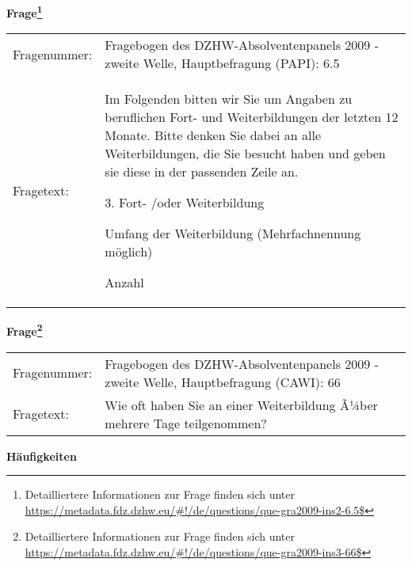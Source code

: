 				\vspace*{0.5cm}
                \noindent\textbf{Frage\footnote{Detailliertere Informationen zur Frage finden sich unter
		              \url{https://metadata.fdz.dzhw.eu/\#!/de/questions/que-gra2009-ins2-6.5$}}}\\
				\begin{tabularx}{\hsize}{@{}lX}
					Fragenummer: &
					  Fragebogen des DZHW-Absolventenpanels 2009 - zweite Welle, Hauptbefragung (PAPI):
					  6.5
 \\
					Fragetext: & Im Folgenden bitten wir Sie um Angaben zu beruflichen Fort- und Weiterbildungen der letzten 12 Monate. Bitte denken Sie dabei an alle Weiterbildungen, die Sie besucht haben und geben sie diese in der passenden Zeile an.\par  3. Fort- /oder Weiterbildung\par  Umfang der Weiterbildung (Mehrfachnennung möglich)\par  Anzahl \\
				\end{tabularx}
				\vspace*{0.5cm}
                \noindent\textbf{Frage\footnote{Detailliertere Informationen zur Frage finden sich unter
		              \url{https://metadata.fdz.dzhw.eu/\#!/de/questions/que-gra2009-ins3-66$}}}\\
				\begin{tabularx}{\hsize}{@{}lX}
					Fragenummer: &
					  Fragebogen des DZHW-Absolventenpanels 2009 - zweite Welle, Hauptbefragung (CAWI):
					  66
 \\
					Fragetext: & Wie oft haben Sie an einer Weiterbildung Ã¼ber mehrere Tage teilgenommen? \\
				\end{tabularx}





        		\vspace*{0.5cm}
                \noindent\textbf{Häufigkeiten}

